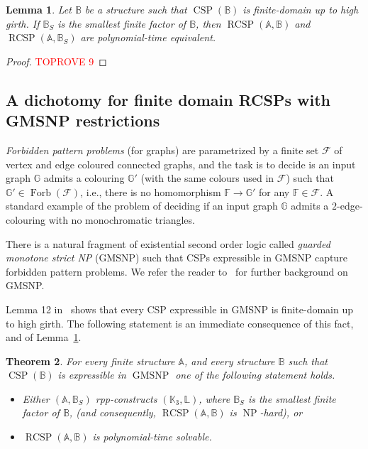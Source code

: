 \documentclass{article}
\newtheorem{theorem}{Theorem}
\newtheorem{lemma}[theorem]{Lemma}
\theoremstyle{definition}
\theoremstyle{remark}
\DeclareMathOperator{\NP}{NP}
\DeclareMathOperator{\Forb}{Forb}
\DeclareMathOperator{\CSP}{CSP}
\DeclareMathOperator{\RCSP}{RCSP}
\DeclareMathOperator{\GMSNP}{GMSNP}
\newcommand{\bA}{{\mathbb A}}
\newcommand{\bB}{{\mathbb B}}
\newcommand{\bF}{{\mathbb F}}
\newcommand{\bG}{{\mathbb G}}
\newcommand{\bK}{{\mathbb K}}
\newcommand{\bL}{{\mathbb L}}
\newcommand{\calF}{{\mathcal F}}
\begin{document}
\begin{lemma}\label{lem:up-to-high-girth-restrictions}
    Let $\bB$ be a structure such that $\CSP(\bB)$ is finite-domain up to high girth.
    If $\bB_S$ is the smallest finite factor of $\bB$, then $\RCSP(\bA,\bB)$ and
    $\RCSP(\bA,\bB_S)$ are polynomial-time equivalent.
\end{lemma}
\begin{proof}\textcolor{red}{TOPROVE 9}\end{proof}


\subsection{A  dichotomy for finite domain RCSPs with GMSNP restrictions}
\label{subsect:GMSNP}

 \emph{Forbidden pattern problems} (for graphs) are parametrized by a finite
set $\calF$ of vertex and edge coloured connected graphs, and the task is to
decide is an input graph $\bG$ admits a colouring $\bG'$ (with the same colours
used in $\calF$) such that $\bG'\in \Forb(\calF)$, i.e., there is no homomorphism
$\bF\to \bG'$ for any $\bF\in \calF$. A standard example of the problem of deciding
if an input graph $\bG$ admits a $2$-edge-colouring with no monochromatic triangles.

There is a natural fragment of existential second order logic called
\emph{guarded monotone strict NP} (GMSNP) such that CSPs expressible in
GMSNP capture forbidden pattern problems. We refer the reader
to~\cite{BarsukovThesis} for further background on GMSNP. 

Lemma 12 in~\cite{guzmanGMSNP} shows that every CSP expressible in GMSNP is
finite-domain up to high girth. The following statement is an immediate consequence
of this fact, and of Lemma~\ref{lem:up-to-high-girth-restrictions}.

\begin{theorem}\label{lem:GMSNP-restrictions}
    For every finite structure $\bA$, and every structure $\bB$ such that $\CSP(\bB)$ 
    is expressible in $\GMSNP$ one of the following statement holds.
    \begin{itemize}
        \item Either $(\bA,\bB_S)$ rpp-constructs $(\bK_3,\bL)$, where $\bB_S$ is the smallest
        finite factor of $\bB$, (and consequently, $\RCSP(\bA,\bB)$ is $\NP$-hard), or
        \item $\RCSP(\bA,\bB)$ is polynomial-time solvable. 
    \end{itemize}
\end{theorem}
\end{document}
